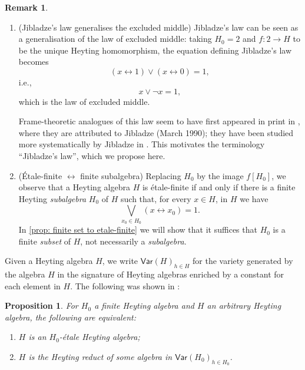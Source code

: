 \documentclass[12pt]{amsart}
\theoremstyle{plain}
\newtheorem{proposition}[theorem]{Proposition}
\theoremstyle{definition}
\newtheorem{remark}[theorem]{Remark}
\begin{document}
\begin{remark} \label{r:etale-finite-basic} \hfill
    \begin{enumerate}
        
        \item
        (Jibladze's law generalises the excluded middle)
        Jibladze's law can be seen as a generalisation of the law of excluded middle: taking $H_{0} = 2$ and $f \colon 2 \to H$ to be the unique Heyting homomorphism, the equation defining Jibladze's law becomes 
        \[ 
            (x \leftrightarrow 1) \vee (x \leftrightarrow 0) = 1,
        \]
        i.e., 
        \[
        x\vee \neg x = 1,
        \]
        which is the law of excluded middle.

        Frame-theoretic analogues of this law seem to have first appeared in print in \cite{kockreyes}, where they are attributed to Jibladze (March 1990); they have been studied more systematically by Jibladze in \cite{jibladzerelativebooleanness}.
        This motivates the terminology ``Jibladze's law'', which we propose here.
        
        \item (\'Etale-finite $\leftrightarrow$ finite subalgebra) \label{i: finite algebra condition}
        Replacing $H_0$ by the image $f[H_0]$, we observe that a Heyting algebra $H$ is étale-finite if and only if there is a finite Heyting \emph{subalgebra} $H_{0}$ of $H$ such that, for every $x \in H$, in $H$ we have
        \[
        \bigvee_{x_0\in H_{0}}(x\leftrightarrow x_0) = 1.
        \]
        In \cref{prop: finite set to etale-finite} we will show that it suffices that $H_0$ is a finite \emph{subset} of $H$, not necessarily a \emph{subalgebra}.
    \end{enumerate}
\end{remark}


Given a Heyting algebra $H$, we write $\mathsf{Var}(H)_{h\in H}$  for the variety generated by the algebra $H$ in the signature of Heyting algebras enriched by a constant for each element in $H$. The following was shown in \cite[pp.~11--12]{kuznetsovetale}:


\begin{proposition} \label{prop: characterisation of etale maps}
    For $H_{0}$ a finite Heyting algebra and $H$ an arbitrary Heyting algebra, the following are equivalent:
    \begin{enumerate}
        \item 
        $H$ is an $H_{0}$-étale Heyting algebra;
        
        \item $H$ is the Heyting reduct of some algebra in $\mathsf{Var}(H_{0})_{h\in H_{0}}$.
    \end{enumerate}
\end{proposition}
\end{document}
